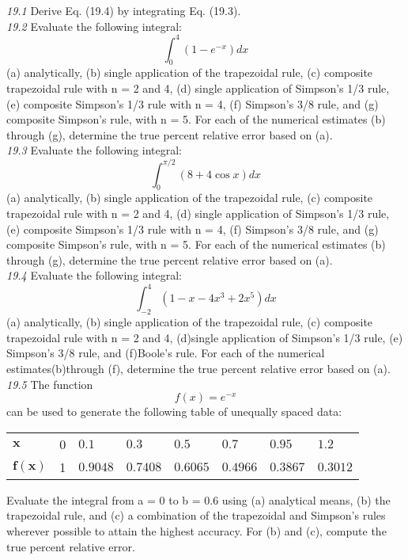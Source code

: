 \documentclass[../main.tex]{subfiles}
\begin{document}
\noindent\textit{19.1} Derive Eq. (19.4) by integrating Eq. (19.3).
\\\noindent\textit{19.2} Evaluate the following integral:
$$\int_{0}^{4}\left(1-e^{-x}\right) d x$$
(a) analytically, (b) single application of the trapezoidal rule,
(c) composite trapezoidal rule with n = 2 and 4, (d) single
application of Simpson's 1/3 rule, (e) composite Simpson's
1/3 rule with n = 4, (f) Simpson's 3/8 rule, and (g) composite Simpson's rule, with n = 5. For each of the numerical
estimates (b) through (g), determine the true percent relative
error based on (a).
\\\noindent\textit{19.3} Evaluate the following integral:
$$\int_{0}^{\pi / 2}(8+4 \cos x) d x$$
(a) analytically, (b) single application of the trapezoidal rule,
(c) composite trapezoidal rule with n = 2 and 4, (d) single
application of Simpson's 1/3 rule, (e) composite Simpson's
1/3 rule with n = 4, (f) Simpson's 3/8 rule, and (g) composite Simpson's rule, with n = 5. For each of the numerical
estimates (b) through (g), determine the true percent relative
error based on (a).
\\\noindent\textit{19.4} Evaluate the following integral:
$$\int_{-2}^{4}\left(1-x-4 x^{3}+2 x^{5}\right) d x$$
(a) analytically, (b) single application of the trapezoidal rule,
(c) composite trapezoidal rule with n = 2 and 4, (d)single application of Simpson's 1/3 rule, (e) Simpson's 3/8 rule, and
(f)Boole's rule. For each of the numerical estimates(b)through
(f), determine the true percent relative error based on (a).
\\\noindent\textit{19.5} The function
$$
f(x)=e^{-x}
$$
can be used to generate the following table of unequally spaced data:
\begin{center}
\begin{tabular}{llllllll}
\hline $\boldsymbol{x}$ & 0 & $0.1$ & $0.3$ & $0.5$ & $0.7$ & $0.95$ & $1.2$ \\
$\boldsymbol{f}(\boldsymbol{x})$ & 1 & $0.9048$ & $0.7408$ & $0.6065$ & $0.4966$ & $0.3867$ & $0.3012$ \\
\hline
\end{tabular}
\end{center}

Evaluate the integral from a = 0 to b = 0.6 using (a) analytical means, (b) the trapezoidal rule, and (c) a combination
of the trapezoidal and Simpson's rules wherever possible to
attain the highest accuracy. For (b) and (c), compute the true
percent relative error.
\end{document}
